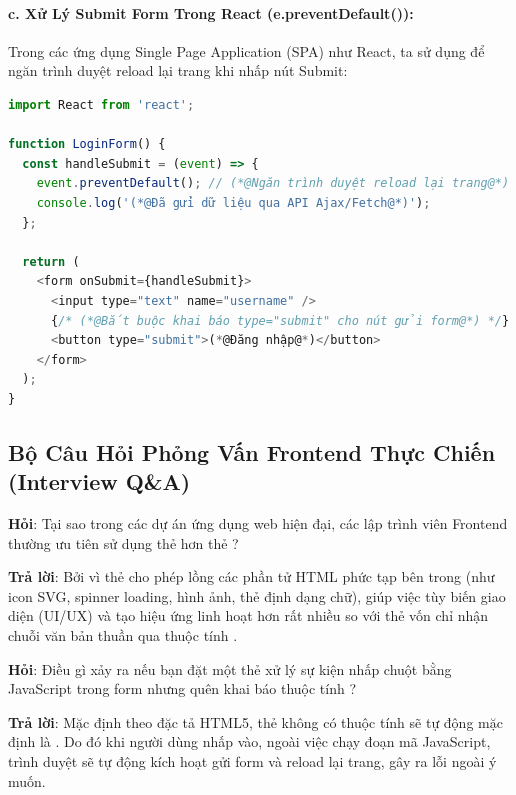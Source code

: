 \paragraph{c. Xử Lý Submit Form Trong React (e.preventDefault()):}
Trong các ứng dụng Single Page Application (SPA) như React, ta sử dụng  để ngăn trình duyệt reload lại trang khi nhấp nút Submit:

\begin{codeWindow}
\begin{lstlisting}[language=JavaScript]
import React from 'react';

function LoginForm() {
  const handleSubmit = (event) => {
    event.preventDefault(); // (*@Ngăn trình duyệt reload lại trang@*)
    console.log('(*@Đã gửi dữ liệu qua API Ajax/Fetch@*)');
  };

  return (
    <form onSubmit={handleSubmit}>
      <input type="text" name="username" />
      {/* (*@Bắt buộc khai báo type="submit" cho nút gửi form@*) */}
      <button type="submit">(*@Đăng nhập@*)</button>
    </form>
  );
}
\end{lstlisting}
\end{codeWindow}

\subsection{Bộ Câu Hỏi Phỏng Vấn Frontend Thực Chiến (Interview Q\&A)}

\begin{noteBox}[Câu Hỏi Phỏng Vấn 1: Sự Khác Biệt Giữa \codeinline{<input type="submit">} và \codeinline{<button type="submit">}]
\textbf{Hỏi}: Tại sao trong các dự án ứng dụng web hiện đại, các lập trình viên Frontend thường ưu tiên sử dụng thẻ  hơn thẻ ?
\par\vspace{3pt}
\textbf{Trả lời}: Bởi vì thẻ  cho phép lồng các phần tử HTML phức tạp bên trong (như icon SVG, spinner loading, hình ảnh, thẻ  định dạng chữ), giúp việc tùy biến giao diện (UI/UX) và tạo hiệu ứng linh hoạt hơn rất nhiều so với thẻ  vốn chỉ nhận chuỗi văn bản thuần qua thuộc tính .
\end{noteBox}

\begin{noteBox}
\textbf{Hỏi}: Điều gì xảy ra nếu bạn đặt một thẻ  xử lý sự kiện nhấp chuột bằng JavaScript trong form nhưng quên khai báo thuộc tính ?
\par\vspace{3pt}
\textbf{Trả lời}: Mặc định theo đặc tả HTML5, thẻ  không có thuộc tính  sẽ tự động mặc định là . Do đó khi người dùng nhấp vào, ngoài việc chạy đoạn mã JavaScript, trình duyệt sẽ tự động kích hoạt gửi form và reload lại trang, gây ra lỗi ngoài ý muốn.
\end{noteBox}

